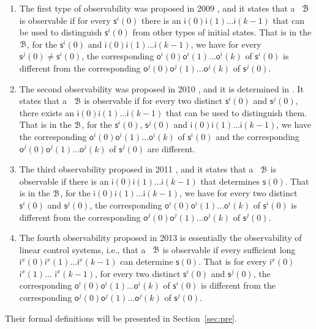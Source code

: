 \begin{enumerate}
	\item The first type of observability was proposed in 2009 \cite{cheng2009controllability}, and it states that a \BCN\ ${\mathcal{B}}$ is observable if for every $\mathsf{s}^{i}(0)$ there is an $\mathsf{i}(0)\mathsf{i}(1)\ldots\mathsf{i}(k-1)$ that can be used to distinguish $\mathsf{s}^{i}(0)$ from other types of initial states. That is in the ${\mathcal{B}}$, for the $\mathsf{s}^{i}(0)$ and $\mathsf{i}(0)$$\mathsf{i}(1)\ldots$$\mathsf{i}(k-1)$, we have for every $\mathsf{s}^{j}(0)\ne\mathsf{s}^{i}(0)$, the corresponding $\mathsf{o}^{i}(0)$$\mathsf{o}^{i}(1)\ldots$$\mathsf{o}^{i}(k)$ of $\mathsf{s}^{i}(0)$ is different from the corresponding $\mathsf{o}^{j}(0)$$\mathsf{o}^{j}(1)\ldots$$\mathsf{o}^{j}(k)$ of $\mathsf{s}^{j}(0)$. 
	\item 
	The second observability was proposed in 2010 \cite{Zhao2010Input}, and it is determined in \cite{Li2015Controllability}. It states that a \BCN\ ${\mathcal{B}}$ is observable if for every two distinct $\mathsf{s}^{i}(0)$ and $\mathsf{s}^{j}(0)$, there exists an $\mathsf{i}(0)$$\mathsf{i}(1)\ldots$$\mathsf{i}(k-1)$ that can be used to distinguish them. That is in the ${\mathcal{B}}$, for the $\mathsf{s}^{i}(0)$, $\mathsf{s}^{j}(0)$ and $\mathsf{i}(0)\mathsf{i}(1)\ldots\mathsf{i}(k-1)$, we have the corresponding $\mathsf{o}^{i}(0)\mathsf{o}^{i}(1)\ldots\mathsf{o}^{i}(k)$ of $\mathsf{s}^{i}(0)$ and the corresponding $\mathsf{o}^{j}(0)\mathsf{o}^{j}(1)\ldots\mathsf{o}^{j}(k)$ of $\mathsf{s}^{j}(0)$ are different.
	\item The third observability proposed in 2011 \cite{Cheng2011Identification}, and it states that a \BCN\ ${\mathcal{B}}$ is observable if there is an $\mathsf{i}(0)$$\mathsf{i}(1)\ldots$$\mathsf{i}(k-1)$ that determines $\mathsf{s}(0)$. That is in the ${\mathcal{B}}$, for the $\mathsf{i}(0)$$\mathsf{i}(1)\ldots$$\mathsf{i}(k-1)$, we have for every two distinct $\mathsf{s}^{i}(0)$ and $\mathsf{s}^{j}(0)$, the corresponding $\mathsf{o}^{i}(0)$$\mathsf{o}^{i}(1)\ldots$$\mathsf{o}^{i}(k)$ of $\mathsf{s}^{i}(0)$ is different from the corresponding $\mathsf{o}^{j}(0)$$\mathsf{o}^{j}(1)\ldots$$\mathsf{o}^{j}(k)$ of $\mathsf{s}^{j}(0)$.
	
	\item  The fourth observability proposed in 2013 \cite{Fornasini2013Observability} is essentially the observability of linear control systems, i.e., that a \BCN\ ${\mathcal{B}}$ is observable if every sufficient long $\mathsf{i}^{x}(0)$$\mathsf{i}^{x}(1)\ldots$$\mathsf{i}^{x}(k-1)$ can determine $\mathsf{s}(0)$. That is for every $\mathsf{i}^{x}(0)$$\mathsf{i}^{x}(1)\ldots$ $\mathsf{i}^{x}(k-1)$, for every two distinct $\mathsf{s}^{i}(0)$ and $\mathsf{s}^{j}(0)$, the corresponding $\mathsf{o}^{i}(0)$$\mathsf{o}^{i}(1)\ldots$$\mathsf{o}^{i}(k)$ of $\mathsf{s}^{i}(0)$ is different from the corresponding $\mathsf{o}^{j}(0)$$\mathsf{o}^{j}(1)\ldots$$\mathsf{o}^{j}(k)$ of $\mathsf{s}^{j}(0)$.
\end{enumerate}
 Their formal definitions will be presented in Section~\ref{sec:pre}.

